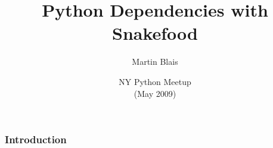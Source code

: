 \documentclass{beamer}
\title{Python Dependencies with Snakefood}
\subtitle{}
\author{Martin Blais}
\institute{Furius Enterprise}
\date{NY Python Meetup \\
{\small (May 2009)}}
\begin{document}
\begin{frame}
  \titlepage
\end{frame}


\begin{frame}[fragile]
  \frametitle{Introduction}


\end{frame}












\end{document}
